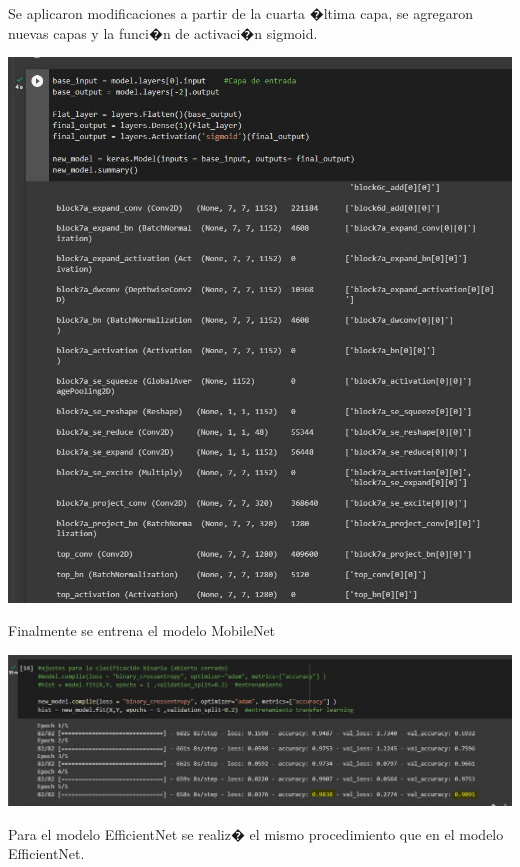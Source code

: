\documentclass[12pt,letterpaper]{article}
\begin{document}
Se aplicaron modificaciones a partir de la cuarta �ltima capa, se agregaron nuevas capas y la funci�n de activaci�n sigmoid.

\begin{center}
  \includegraphics[scale=0.4]{imagenes/effinettl.JPG}
 \label{fig:MobileNetTL} 
\end{center} 

Finalmente se entrena el modelo MobileNet 

\begin{center}
  \includegraphics[scale=0.4]{imagenes/entrenamientoen.JPG}
 \label{fig:EfficientEn} 
\end{center} 


Para el modelo EfficientNet se realiz� el mismo procedimiento que en el modelo EfficientNet.
\end{document}
